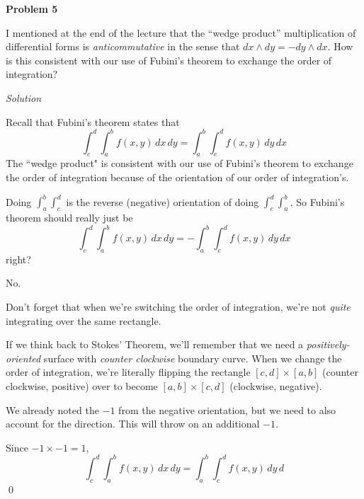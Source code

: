 \documentclass{article}
\newcommand{\Solution}{\textit{Solution}}
\begin{document}
{}\textbf{Problem 5} 

I mentioned at the end of the lecture that the “wedge product” multiplication of
differential forms is \textit{anticommutative} in the sense that $\displaystyle dx\wedge dy=-dy\wedge dx$. How is
this consistent with our use of Fubini’s theorem to exchange the order of integration?

\Solution

Recall that Fubini's theorem states that
\begin{equation*}
    \int_c^d\int_a^bf(x,y)\,dx\,dy=\int_a^b\int_c^d f(x,y)\,dy\,dx
\end{equation*}
The ``wedge product" is consistent with our use of Fubini's theorem to exchange the order of integration because of the orientation of our order of integration's.

Doing $\int_a^b\int_c^d$ is the reverse (negative) orientation of doing $\int_c^d\int_a^b$. So Fubini's theorem should really just be
\begin{equation*}
     \int_c^d\int_a^bf(x,y)\,dx\,dy=-\int_a^b\int_c^d f(x,y)\,dy\,dx
\end{equation*}
right?

No.

Don't forget that when we're switching the order of integration, we're not \textit{quite} integrating over the same rectangle. 

If we think back to Stokes' Theorem, we'll remember that we need a \textit{positively-oriented} surface with \textit{counter clockwise} boundary curve. When we change the order of integration, we're literally flipping the rectangle $[c, d]\times [a, b]$ (counter clockwise, positive) over to become $[a, b]\times [c, d]$ (clockwise, negative).

We already noted the $-1$ from the negative orientation, but we need to also account for the direction. This will throw on an additional $-1$. 

Since $-1\times -1=1$,
\begin{equation*}
    \int_c^d\int_a^bf(x,y)\,dx\,dy=\int_a^b\int_c^df(x,y)\,dy\,d
\end{equation*}
\qed
\end{document}

